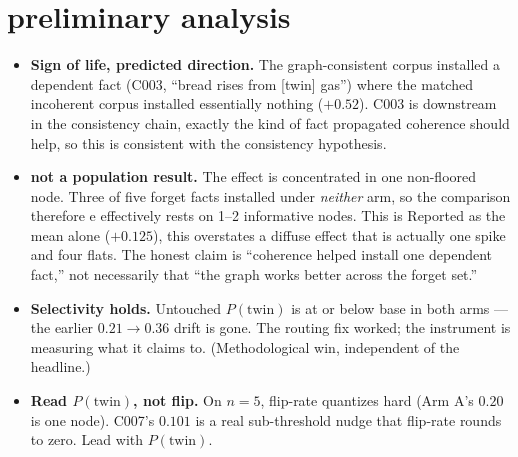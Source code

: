 \documentclass[11pt]{article}
\newcommand{\Ptwin}{P(\text{twin})}
\begin{document}
\section{preliminary analysis }
\begin{itemize}
  \item \textbf{Sign of life, predicted direction.} The graph-consistent corpus
        installed a dependent fact (C003, ``bread rises from [twin] gas'') where
        the matched incoherent corpus installed essentially nothing
        ($+0.52$). C003 is downstream in the consistency chain, exactly the kind of
        fact propagated coherence should help, so this is consistent with the
        consistency hypothesis.
  \item \textbf{not a population result.} The effect is concentrated in one
        non-floored node. Three of five forget facts installed under
        \emph{neither} arm, so the comparison therefore e effectively rests on 1--2 informative
        nodes. This is Reported as the mean alone ($+0.125$), this overstates a diffuse
        effect that is actually one spike and four flats. The honest claim is
        ``coherence helped install one dependent fact,'' not necessarily that ``the graph works
        better across the forget set.''
  \item \textbf{Selectivity holds.} Untouched $\Ptwin$ is at or below base in both
        arms --- the earlier $0.21\to0.36$ drift is gone. The routing fix worked;
        the instrument is measuring what it claims to. (Methodological win,
        independent of the headline.)
  \item \textbf{Read $\Ptwin$, not flip.} On $n{=}5$, flip-rate quantizes hard
        (Arm A's $0.20$ is one node). C007's $0.101$ is a real sub-threshold nudge
        that flip-rate rounds to zero. Lead with $\Ptwin$.
\end{itemize}
\end{document}

